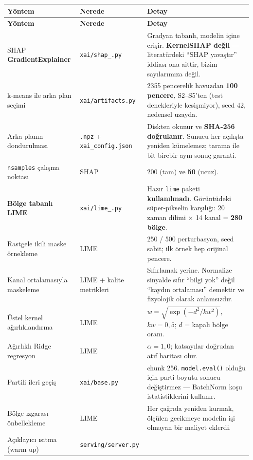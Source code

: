 \documentclass[11pt,a4paper]{article}
\newcommand{\kod}[1]{\texttt{\small #1}}
\newcommand{\dosya}[1]{\texttt{\footnotesize #1}}
\begin{document}
\begin{longtable}{@{}p{4.0cm}p{2.9cm}p{8.6cm}@{}}
\toprule
\textbf{Yöntem} & \textbf{Nerede} & \textbf{Detay} \\
\midrule
\endfirsthead
\toprule
\textbf{Yöntem} & \textbf{Nerede} & \textbf{Detay} \\
\midrule
\endhead
SHAP \textbf{GradientExplainer} & \dosya{xai/shap\_.py} &
Gradyan tabanlı, modelin içine erişir. \textbf{KernelSHAP değil} ---
literatürdeki ``SHAP yavaştır'' iddiası ona aittir, bizim sayılarımıza değil. \\
\addlinespace
k-means ile arka plan seçimi & \dosya{xai/artifacts.py} &
2355 pencerelik havuzdan \textbf{100 pencere}, S2--S5'ten (test denekleriyle
kesişmiyor), seed 42, nedensel uzayda. \\
\addlinespace
Arka planın dondurulması & \kod{.npz} + \kod{xai\_config.json} &
Diskten okunur ve \textbf{SHA-256 doğrulanır}. Sunucu her açılışta yeniden
kümelemez; tarama ile bit-birebir aynı sonuç garanti. \\
\addlinespace
\kod{nsamples} çalışma noktası & SHAP & 200 (tam) ve \textbf{50} (ucuz). \\
\addlinespace
\textbf{Bölge tabanlı LIME} & \dosya{xai/lime\_.py} &
Hazır \kod{lime} paketi \textbf{kullanılmadı}. Görüntüdeki süper-pikselin
karşılığı: 20 zaman dilimi $\times$ 14 kanal = \textbf{280 bölge}. \\
\addlinespace
Rastgele ikili maske örnekleme & LIME &
250 / 500 perturbasyon, seed sabit; ilk örnek hep orijinal pencere. \\
\addlinespace
Kanal ortalamasıyla maskeleme & LIME + kalite metrikleri &
Sıfırlamak yerine. Normalize sinyalde sıfır ``bilgi yok'' değil ``kaydın
ortalaması'' demektir ve fizyolojik olarak anlamsızdır. \\
\addlinespace
Üstel kernel ağırlıklandırma & LIME &
$w=\sqrt{\exp(-d^2/kw^2)}$, $kw=0{,}5$; $d$ = kapalı bölge oranı. \\
\addlinespace
Ağırlıklı Ridge regresyon & LIME &
$\alpha=1{,}0$; katsayılar doğrudan atıf haritası olur. \\
\addlinespace
Partili ileri geçiş & \dosya{xai/base.py} &
chunk 256. \kod{model.eval()} olduğu için parti boyutu sonucu değiştirmez ---
BatchNorm koşu istatistiklerini kullanır. \\
\addlinespace
Bölge ızgarası önbellekleme & LIME &
Her çağrıda yeniden kurmak, ölçülen gecikmeye modelin işi olmayan bir maliyet
eklerdi. \\
\addlinespace
Açıklayıcı ısıtma (warm-up) & \dosya{serving/server.py} &

\end{longtable}
\end{document}
